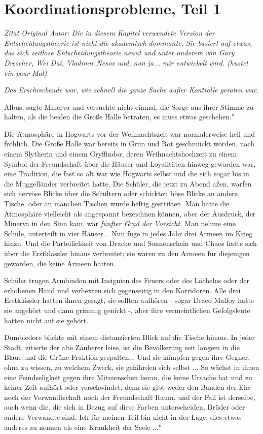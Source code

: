 \chapter{Koordinationsprobleme, Teil 1}

\emph{Zitat Original Autor: Die in diesem Kapitel verwendete Version der
Entscheidungstheorie ist nicht die akademisch dominante. Sie basiert auf etwas,
das sich \glqq zeitlose Entscheidungstheorie\grqq{} nennt und unter anderem von
Gary Drescher, Wei Dai, Vladimir Nesov und, nun ja... mir entwickelt wird.
(hustet ein paar Mal).}

\emph{Das Erschreckende war, wie schnell die ganze Sache außer Kontrolle
geraten war.}

\glqq Albus\grqq{}, sagte Minerva und versuchte nicht einmal, die Sorge aus
ihrer Stimme zu halten, als die beiden die Große Halle betraten, \glqq es muss
etwas geschehen."

Die Atmosphäre in Hogwarts vor der Weihnachtszeit war normalerweise hell und
fröhlich. Die Große Halle war bereits in Grün und Rot geschmückt worden, nach
einem Slytherin und einem Gryffindor, deren Weihnachtshochzeit zu einem Symbol
der Freundschaft über die Häuser und Loyalitäten hinweg geworden war, eine
Tradition, die fast so alt war wie Hogwarts selbst und die sich sogar bis in die
Muggelländer verbreitet hatte. Die Schüler, die jetzt zu Abend aßen, warfen sich
nervöse Blicke über die Schultern oder schickten böse Blicke an andere Tische,
oder an manchen Tischen wurde heftig gestritten. Man hätte die Atmosphäre
vielleicht als angespannt bezeichnen können, aber der Ausdruck, der Minerva in
den Sinn kam, war \emph{fünfter Grad der Vorsicht.} Man nehme eine Schule,
unterteilt in vier Häuser... Nun füge in jedes Jahr drei Armeen im Krieg hinzu.
Und die Parteilichkeit von Drache und Sonnenschein und Chaos hatte sich über die
Erstklässler hinaus verbreitet; sie waren zu den Armeen für diejenigen geworden,
die keine Armeen hatten.

Schüler trugen Armbinden mit Insignien des Feuers oder des Lächelns oder der
erhobenen Hand und verhexten sich gegenseitig in den Korridoren. Alle drei
Erstklässler hatten ihnen gesagt, sie sollten aufhören - sogar Draco Malfoy
hatte sie angehört und dann grimmig genickt -, aber ihre vermeintlichen
Gefolgsleute hatten nicht auf sie gehört.

Dumbledore blickte mit einem distanzierten Blick auf die Tische hinaus. \glqq In
jeder Stadt\grqq{}, zitierte der alte Zauberer leise, \glqq ist die Bevölkerung
seit langem in die Blaue und die Grüne Fraktion gespalten... Und sie kämpfen
gegen ihre Gegner, ohne zu wissen, zu welchem Zweck, sie gefährden sich selbst
... So wächst in ihnen eine Feindseligkeit gegen ihre Mitmenschen heran, die
keine Ursache hat und zu keiner Zeit aufhört oder verschwindet, denn sie gibt
weder den Banden der Ehe noch der Verwandtschaft noch der Freundschaft Raum, und
der Fall ist derselbe, auch wenn die, die sich in Bezug auf diese Farben
unterscheiden, Brüder oder andere Verwandte sind. Ich für meinen Teil bin nicht
in der Lage, dies etwas anderes zu nennen als eine Krankheit der Seele ..."

